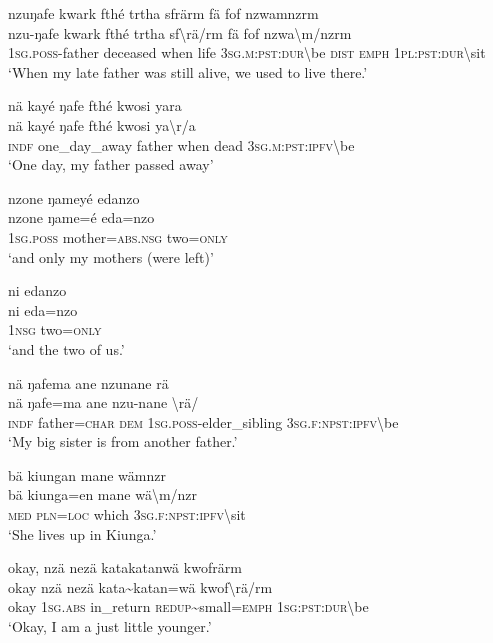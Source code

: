 \newpage
\ea\label{ex:14:a2919}
nzuŋafe kwark fthé trtha sfrärm fä fof nzwamnzrm\\
\gll nzu-ŋafe	kwark	fthé	trtha	sf{\textbackslash}rä/rm	fä	fof	nzwa{\textbackslash}m/nzrm\\
     1\textsc{sg}.\textsc{poss}-father	deceased	when	life	3\textsc{sg}.\textsc{m}:\textsc{pst}:\textsc{dur}{\textbackslash}be	\textsc{dist}	\textsc{emph}	1\textsc{pl}:\textsc{pst}:\textsc{dur}{\textbackslash}sit\\
\glt `When my late father was still alive, we used to live there.'
\z

\ea\label{ex:14:a2921}
nä kayé ŋafe fthé kwosi yara\\
\gll nä	kayé	ŋafe	fthé	kwosi	ya{\textbackslash}r/a\\
     \textsc{indf}	one\_day\_away	father	when	dead	3\textsc{sg}.\textsc{m}:\textsc{pst}:\textsc{ipfv}{\textbackslash}be\\
\glt `One day, my father passed away'
\z

\ea\label{ex:14:a2923}
nzone ŋameyé edanzo\\
\gll nzone	ŋame=é	eda=nzo\\
     1\textsc{sg}.\textsc{poss}	mother=\textsc{abs}.\textsc{nsg}	two=\textsc{only}\\
\glt `and only my mothers (were left)'
\z

\ea\label{ex:14:a2924}
ni edanzo\\
\gll ni	eda=nzo\\
     1\textsc{nsg}	two=\textsc{only}\\
\glt `and the two of us.'
\z

\ea\label{ex:14:a2926}
nä ŋafema ane nzunane rä\\
\gll nä	ŋafe=ma	ane	nzu-nane	{\textbackslash}rä/\\
     \textsc{indf}	father=\textsc{char}	\textsc{dem}	1\textsc{sg}.\textsc{poss}-elder\_sibling	3\textsc{sg}.\textsc{f}:\textsc{npst}:\textsc{ipfv}{\textbackslash}be\\
\glt `My big sister is from another father.'
\z

\ea\label{ex:14:a2927}
bä kiungan mane wämnzr\\
\gll bä	kiunga=en	mane	wä{\textbackslash}m/nzr\\
     \textsc{med}	\textsc{pln}=\textsc{loc}	which	3\textsc{sg}.\textsc{f}:\textsc{npst}:\textsc{ipfv}{\textbackslash}sit\\
\glt `She lives up in Kiunga.'
\z

\ea\label{ex:14:a2928}
okay, nzä nezä katakatanwä kwofrärm\\
\gll okay	nzä	nezä	kata{\textasciitilde}katan=wä	kwof{\textbackslash}rä/rm\\
     okay	1\textsc{sg}.\textsc{abs}	in\_return	\textsc{redup}{\textasciitilde}small=\textsc{emph}	1\textsc{sg}:\textsc{pst}:\textsc{dur}{\textbackslash}be\\
\glt `Okay, I am a just little younger.'
\z


